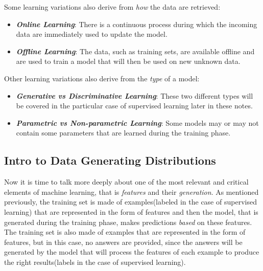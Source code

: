 \noindent Some learning variations also derive from \emph{how} the data
are retrieved:

\begin{itemize}
      \item \emph{\textbf{Online Learning}}: There is a continuous
            process during which the incoming data are immediately
            used to update the model.

      \item \emph{\textbf{Offline Learning}}: The data, such as training
            sets, are available offline and are used to train a model
            that will then be used on new unknown data.
\end{itemize}

\noindent Other learning variations also derive from the \emph{type} of
a model:

\begin{itemize}
      \item \emph{\textbf{Generative vs Discriminative Learning}}:
            These two different types will be covered in the
            particular case of supervised learning later in these notes.
      \item \emph{\textbf{Parametric vs Non-parametric Learning}}:
            Some models may or may not contain some parameters that
            are learned during the training phase.
\end{itemize}

\subsection{Intro to Data Generating Distributions}

Now it is time to talk more deeply about one of the most relevant
and critical elements of machine learning, that is \emph{features}
and their \emph{generation}. As mentioned previously, the training
set is made of examples(labeled in the case of supervised learning)
that are represented in the form of features and then the model,
that is generated during the training phase, makes predictions
\emph{based} on these features. The training set is also made of
examples that are represented in the form of features, but in this
case, no answers are provided, since the answers will be generated by
the model that will process the features of each example to produce
the right results(labels in the case of supervised learning).

\newpage

